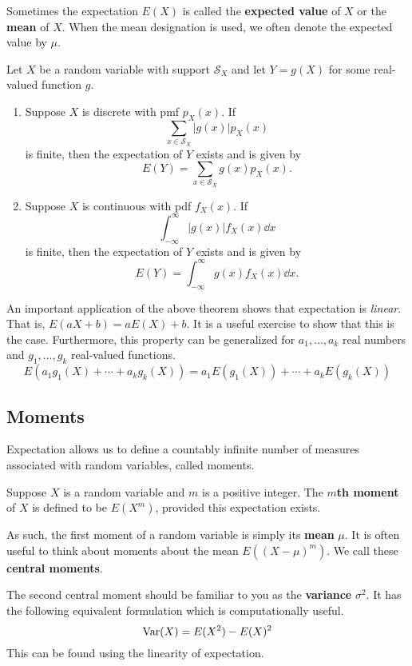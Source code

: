 Sometimes the expectation $E(X)$ is called the \textbf{expected value} of $X$ or the \textbf{mean} of $X$. When the mean designation is used, we often denote the expected value by $\mu$.

\begin{theorem}
	Let $X$ be a random variable with support $\mathcal S_X$ and let $Y=g(X)$ for some real-valued function $g$.
	\begin{enumerate}[label=\color{main}(\alph*)]
		\item Suppose $X$ is discrete with pmf $p_X(x)$. If $$\sum_{x\in\mathcal S_X}|g(x)|p_X(x)$$ is finite, then the expectation of $Y$ exists and is given by $$E(Y)=\sum_{x\in\mathcal S_X}g(x)p_X(x).$$
		\item Suppose $X$ is continuous with pdf $f_X(x)$. If $$\int_{-\infty}^{\infty}|g(x)|f_X(x)\dd x$$ is finite, then the expectation of $Y$ exists and is given by $$E(Y)=\int_{-\infty}^{\infty}g(x)f_X(x)\dd x.$$
	\end{enumerate}
\end{theorem}

An important application of the above theorem shows that expectation is \textit{linear}. That is, $E(aX+b)=aE(X)+b$. It is a useful exercise to show that this is the case. Furthermore, this property can be generalized for $a_1,\hdots,a_k$ real numbers and $g_1,\hdots,g_k$ real-valued functions.
$$E(a_1g_1(X)+\cdots+a_kg_k(X))=a_1E(g_1(X))+\cdots+a_kE(g_k(X))$$

\subsection{Moments}

Expectation allows us to define a countably infinite number of measures associated with random variables, called moments.

\begin{definition}[moment]
	Suppose $X$ is a random variable and $m$ is a positive integer. The \textbf{$m$th moment} of $X$ is defined to be $E(X^m)$, provided this expectation exists.
\end{definition}

As such, the first moment of a random variable is simply its \textbf{mean} $\mu$. It is often useful to think about moments about the mean $E((X-\mu)^m)$. We call these \textbf{central moments}.

The second central moment should be familiar to you as the \textbf{variance} $\sigma^2$. It has the following equivalent formulation which is computationally useful. $$\operatorname{Var}(X)=E(X^2)-E(X)^2$$
This can be found using the linearity of expectation.

